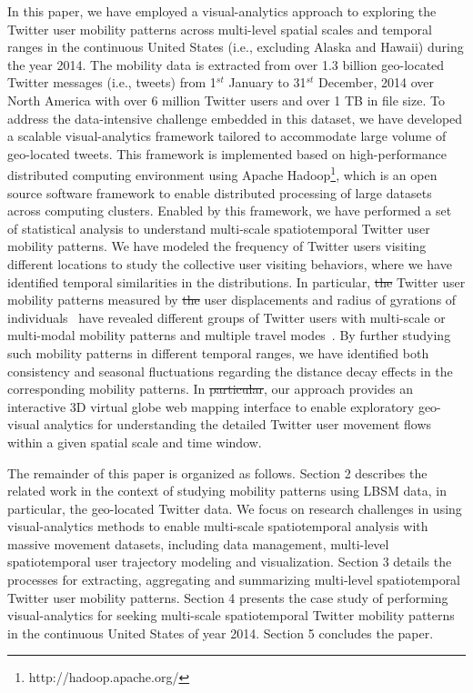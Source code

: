 \documentclass[ijgi,article,submit,moreauthors,pdftex,10pt,a4paper]{mdpi}
\theoremstyle{mdpi}
\newcounter{ex}
\newcounter{re}
\theoremstyle{mdpidefinition}
\providecommand{\DIFadd}[1]{{\protect\color{blue}\uwave{#1}}} %
\providecommand{\DIFdel}[1]{{\protect\color{red}\sout{#1}}}                      %
\providecommand{\DIFaddbegin}{} %
\providecommand{\DIFaddend}{} %
\providecommand{\DIFdelbegin}{} %
\providecommand{\DIFdelend}{} %
\begin{document}
In this paper, we have employed a visual-analytics approach to exploring the Twitter user mobility patterns across multi-level spatial scales and temporal ranges in the continuous United States (i.e., excluding Alaska and Hawaii) during the year 2014.
The mobility data is extracted from over 1.3 billion geo-located Twitter messages (i.e., tweets) from 1$^{st}$ January to 31$^{st}$ December, 2014 over North America with over 6 million Twitter users and over 1 TB in file size.
To address the data-intensive challenge embedded in this dataset, we have developed a scalable visual-analytics framework tailored to accommodate large volume of geo-located tweets.
This framework is implemented based on high-performance distributed computing environment using Apache Hadoop\footnote{http://hadoop.apache.org/}, which is an open source software framework to enable distributed processing of large datasets across computing clusters.
Enabled by this framework, we have performed a set of statistical analysis to understand multi-scale spatiotemporal Twitter user mobility patterns. 
We have modeled the frequency of Twitter users visiting different locations to study the collective user visiting behaviors, where we have identified temporal similarities in the distributions.
In particular, \DIFdelbegin \DIFdel{the }\DIFdelend Twitter user mobility patterns measured by \DIFdelbegin \DIFdel{the }\DIFdelend user displacements and radius of gyrations of individuals~\cite{gonzalez2008understanding} have revealed different groups of Twitter users with multi-scale or multi-modal mobility patterns and multiple travel modes~\cite{Jurdak2015}.
By further studying such mobility patterns in different temporal ranges, we have identified both consistency and seasonal fluctuations regarding the distance decay effects in the corresponding mobility patterns.
In \DIFdelbegin \DIFdel{particular}\DIFdelend \DIFaddbegin \DIFadd{addition}\DIFaddend , our approach provides an interactive 3D virtual globe web mapping interface to enable exploratory geo-visual analytics for understanding the detailed Twitter user movement flows within a given spatial scale and time window.

The remainder of this paper is organized as follows.
Section 2 describes the related work in the context of studying mobility patterns using LBSM data, in particular, the geo-located Twitter data.
We focus on research challenges in using visual-analytics methods to enable multi-scale spatiotemporal analysis with massive movement datasets, including data management, multi-level spatiotemporal user trajectory modeling and visualization.
Section 3 details the processes for extracting, aggregating and summarizing multi-level spatiotemporal Twitter user mobility patterns.
Section 4 presents the case study of performing visual-analytics for seeking multi-scale spatiotemporal Twitter mobility patterns in the continuous United States of year 2014.
Section 5 concludes the paper.
\end{document}
